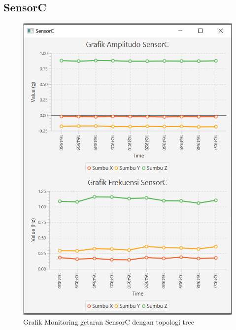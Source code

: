 \subsection{SensorC}
\begin{figure}[H] 
	\centering  
	\includegraphics[scale=1]{Lampiran/HasilPengujian/sensorC_tree.PNG} 
	\caption[Grafik Monitoring getaran SensorC dengan topologi tree]{Grafik Monitoring getaran SensorC dengan topologi tree}
	\label{fig:grafik_C_tree_paskal} 
\end{figure}

